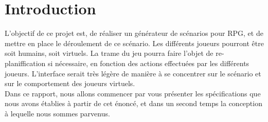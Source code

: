 \documentclass[asi]{picINSA}
\begin{document}

  \couverture{}

  \tableofcontents{}

\chapter{Introduction}
L'objectif de ce projet est, de réaliser un générateur de scénarios pour RPG, et de mettre en place le déroulement de ce scénario. Les différents joueurs pourront être soit humains, soit virtuels. La trame du jeu pourra faire l'objet de re-planiffication si nécessaire, en fonction des actions effectuées par les différents joueurs. L'interface serait très légère de manière à se concentrer sur le scénario et sur le comportement des joueurs virtuels. \\

Dans ce rapport, nous allons commencer par vous présenter les spécifications que nous avons établies à partir de cet énoncé, et dans un second temps la conception à lequelle nous sommes parvenus.
\end{document}
